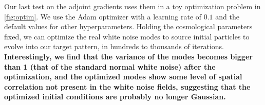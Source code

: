\documentclass[modern, dvipsnames]{aastex631}
\newcommand{\HL}[1]{\textcolor{Bittersweet}{\textbf{#1}}}
\begin{document}
Our last test on the adjoint gradients uses them in a toy optimization
problem in \autoref{fig:optim}.
We use the Adam optimizer \citep{Adam} with a learning rate of $0.1$ and
the default values for other hyperparameters.
Holding the cosmological parameters fixed, we can optimize the real
white noise modes to source initial particles to evolve into our target
pattern, in hundreds to thousands of iterations.
\HL{Interestingly, we find that the variance of the modes becomes bigger
than 1 (that of the standard normal white noise) after the optimization,
and the optimized modes show some level of spatial correlation not
present in the white noise fields, suggesting that the optimized initial
conditions are probably no longer Gaussian.}


\begin{figure}[t]
\centering
{}
\hfill
{}
\\
\hfill
{}
\end{figure}
\end{document}
